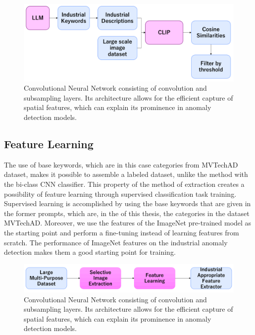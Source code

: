 \begin{figure}[t]
	\begin{center}
		\includegraphics[width=1.0\linewidth]{Chapter_3/llm_extraction.png}
	\end{center}
	\caption{Convolutional Neural Network consisting of convolution and subsampling layers. Its architecture allows for the efficient capture of spatial features, which can explain its prominence in anomaly detection models.}
	\label{fig:cnn}
\end{figure} 	

\subsection{Feature Learning}
\label{feature learning llm}
The use of base keywords, which are in this case categories from MVTechAD dataset, makes it possible to assemble a labeled dataset, unlike the method with the bi-class CNN classifier. This property of the method of extraction creates a possibility of feature learning through supervised classification task training. Supervised learning is accomplished by using the base keywords that are given in the former prompts, which are, in the of this thesis, the categories in the dataset MVTechAD. Moreover, we use the features of the ImageNet pre-trained model as the starting point and perform a fine-tuning instead of learning features from scratch. The performance of ImageNet features on the industrial anomaly detection makes them a good starting point for training.

\begin{figure}[t]
	\begin{center}
		\includegraphics[width=1.0\linewidth]{Chapter_3/selective_extraction.png}
	\end{center}
	\caption{Convolutional Neural Network consisting of convolution and subsampling layers. Its architecture allows for the efficient capture of spatial features, which can explain its prominence in anomaly detection models.}
	\label{fig:cnn}
\end{figure} 	
